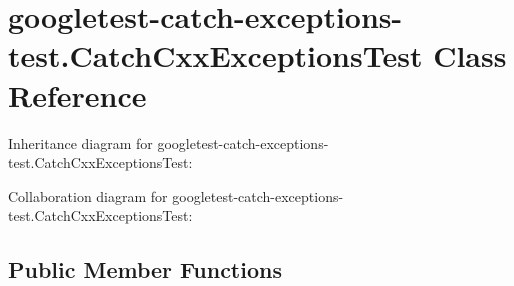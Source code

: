 \hypertarget{classgoogletest-catch-exceptions-test_1_1CatchCxxExceptionsTest}{}\section{googletest-\/catch-\/exceptions-\/test.Catch\+Cxx\+Exceptions\+Test Class Reference}
\label{classgoogletest-catch-exceptions-test_1_1CatchCxxExceptionsTest}


Inheritance diagram for googletest-\/catch-\/exceptions-\/test.Catch\+Cxx\+Exceptions\+Test\+:


Collaboration diagram for googletest-\/catch-\/exceptions-\/test.Catch\+Cxx\+Exceptions\+Test\+:
\subsection*{Public Member Functions}
